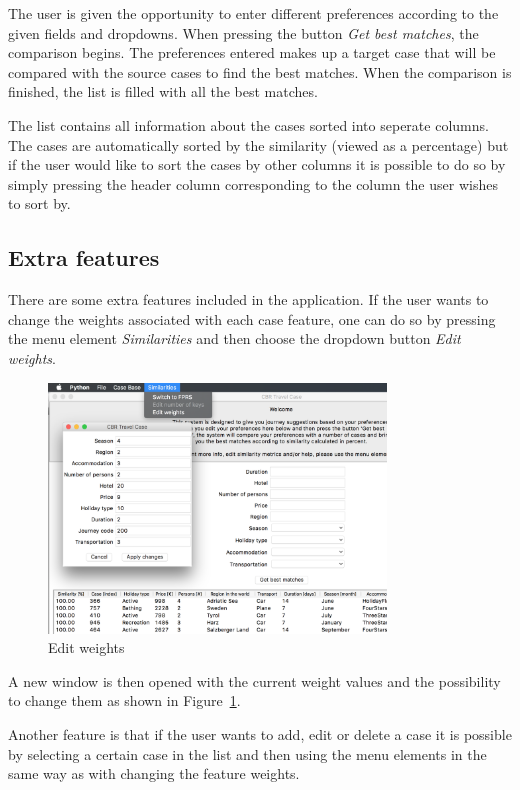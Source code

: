 \documentclass[12pt]{article}
\begin{document}
The user is given the opportunity to enter different preferences according to the given fields and dropdowns. When pressing the button \textit{Get best matches}, the comparison begins. The preferences entered makes up a target case that will be compared with the source cases to find the best matches. When the comparison is finished, the list is filled with all the best matches. 

The list contains all information about the cases sorted into seperate columns. The cases are automatically sorted by the similarity (viewed as a percentage) but if the user would like to sort the cases by other columns it is possible to do so by simply pressing the header column corresponding to the column the user wishes to sort by. 

\subsection{Extra features}
\label{sec:extra}

There are some extra features included in the application. If the user wants to change the weights associated with each case feature, one can do so by pressing the menu element \textit{Similarities} and then choose the dropdown button \textit{Edit weights}. 

\begin{figure}[h]
\centering
\includegraphics[width=0.8\textwidth]{edit-weights.png}
\caption{\label{fig:edit-weights.png}Edit weights}
\end{figure}

A new window is then opened with the current weight values and the possibility to change them as shown in Figure~\ref{fig:edit-weights.png}.

Another feature is that if the user wants to add, edit or delete a case it is possible by selecting a certain case in the list and then using the menu elements in the same way as with changing the feature weights. 
\end{document}
